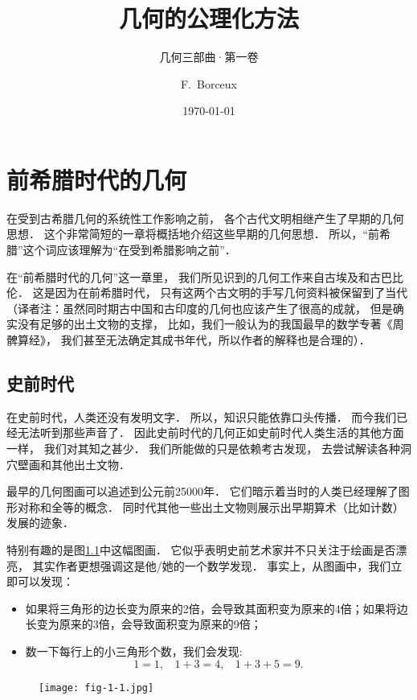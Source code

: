 \documentclass[cn,fancy,blue,11pt]{elegantbook}
\title{几何的公理化方法}
\subtitle{几何三部曲·第一卷}
\author{F.~Borceux}
\institute{山东理工大学}
\date{\today}
\begin{document}

\maketitle

\tableofcontents

\mainmatter
\hypersetup{pageanchor=true}

\chapter{前希腊时代的几何}

在受到古希腊几何的系统性工作影响之前，
各个古代文明相继产生了早期的几何思想．
这个非常简短的一章将概括地介绍这些早期的几何思想．
所以，``前希腊''这个词应该理解为``在受到希腊影响之前''．

在``前希腊时代的几何''这一章里，
我们所见识到的几何工作来自古埃及和古巴比伦．
这是因为在前希腊时代，
只有这两个古文明的手写几何资料被保留到了当代
（译者注：虽然同时期古中国和古印度的几何也应该产生了很高的成就，
但是确实没有足够的出土文物的支撑，
比如，我们一般认为的我国最早的数学专著《周髀算经》，
我们甚至无法确定其成书年代，所以作者的解释也是合理的）．

\section{史前时代}

在史前时代，人类还没有发明文字．
所以，知识只能依靠口头传播．
而今我们已经无法听到那些声音了．
因此史前时代的几何正如史前时代人类生活的其他方面一样，
我们对其知之甚少．
我们所能做的只是依赖考古发现，
去尝试解读各种洞穴壁画和其他出土文物．

最早的几何图画可以追述到公元前25000年．
它们暗示着当时的人类已经理解了图形对称和全等的概念．
同时代其他一些出土文物则展示出早期算术（比如计数）发展的迹象．

特别有趣的是图\ref{fig:1-1}中这幅图画．
它似乎表明史前艺术家并不只关注于绘画是否漂亮，
其实作者更想强调这是他/她的一个数学发现．
事实上，从图画中，我们立即可以发现：
\begin{itemize}
	\item 如果将三角形的边长变为原来的2倍，会导致其面积变为原来的4倍；如果将边长变为原来的3倍，会导致面积变为原来的9倍；
	\item 数一下每行上的小三角形个数，我们会发现:\[1=1,~~~~1+3=4,~~~~1+3+5=9.\]
\end{itemize}

\begin{figure}[htbp]
	\centering
	\texttt{[image: fig-1-1.jpg]}
	\caption{\label{fig:1-1}}
\end{figure}
\end{document}
